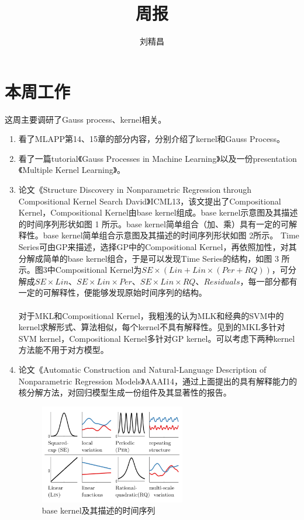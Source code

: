\documentclass{ctexart}
\begin{document}
\title{周报}
\author{刘精昌}
\maketitle

\fangsong
\section*{本周工作}
    这周主要调研了Gauss process、kernel相关。
\begin{enumerate}
  \item 看了MLAPP第14、15章的部分内容，分别介绍了kernel和Gauss Process。
  \item 看了一篇tutorial《Gauss Processes in Machine Learning》以及一份presentation《Multiple Kernel Learning》。
  \item 论文《Structure Discovery in Nonparametric Regression through Compositional Kernel Search
David》ICML13，该文提出了Compositional Kernel，Compositional Kernel由base kernel组成。base kernel示意图及其描述的时间序列形状如图 1 所示。base kernel简单组合（加、乘）具有一定的可解释性。base kernel简单组合示意图及其描述的时间序列形状如图 2所示。 Time Series可由GP来描述，选择GP中的Compositional Kernel，再依照加性，对其分解成简单的base kernel组合，于是可以发现Time Series的结构，如图 3 所示。图3中Compositional Kernel为$SE × ( Lin + Lin × ( Per + RQ ) )$，可分解成$SE × Lin$、$SE × Lin × Per$、$SE × Lin × RQ$、$Residuals$，每一部分都有一定的可解释性，便能够发现原始时间序列的结构。
\\
\\
对于MKL和Compositional Kernel，我粗浅的认为MLK和经典的SVM中的kernel求解形式、算法相似，每个kernel不具有解释性。见到的MKL多针对SVM kernel，Compositional Kernel多针对GP kernel。可以考虑下两种kernel方法能不用于对方模型。

  \item 论文《Automatic Construction and Natural-Language Description of Nonparametric Regression Models》AAAI14，通过上面提出的具有解释能力的核分解方法，对回归模型生成一份组件及其显著性的报告。
\begin{figure}
  \centering
  \includegraphics[width=0.6\textwidth]{base.png}
  \caption{base kernel及其描述的时间序列}\label{2}
\end{figure}


\end{enumerate}
\end{document}
